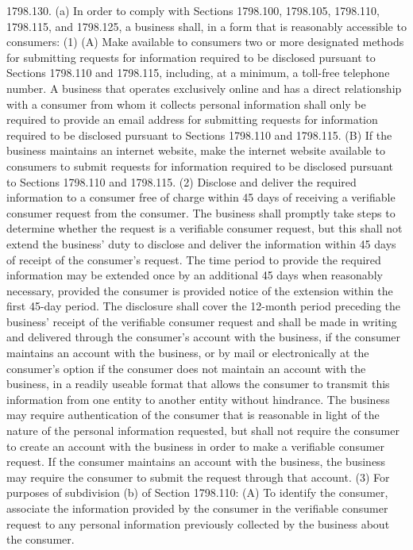 1798.130.  (a) In order to comply with Sections 1798.100, 1798.105, 1798.110, 1798.115, and 1798.125, a business shall, in a form that is reasonably accessible to consumers:
(1) (A) Make available to consumers two or more designated methods for submitting requests for information required to be disclosed pursuant to Sections 1798.110 and 1798.115, including, at a minimum, a toll-free telephone number. A business that operates exclusively online and has a direct relationship with a consumer from whom it collects personal information shall only be required to provide an email address for submitting requests for information required to be disclosed pursuant to Sections 1798.110 and 1798.115.
(B) If the business maintains an internet website, make the internet website available to consumers to submit requests for information required to be disclosed pursuant to Sections 1798.110 and 1798.115.
(2) Disclose and deliver the required information to a consumer free of charge within 45 days of receiving a verifiable consumer request from the consumer. The business shall promptly take steps to determine whether the request is a verifiable consumer request, but this shall not extend the business’ duty to disclose and deliver the information within 45 days of receipt of the consumer’s request. The time period to provide the required information may be extended once by an additional 45 days when reasonably necessary, provided the consumer is provided notice of the extension within the first 45-day period. The disclosure shall cover the 12-month period preceding the business’ receipt of the verifiable consumer request and shall be made in writing and delivered through the consumer’s account with the business, if the consumer maintains an account with the business, or by mail or electronically at the consumer’s option if the consumer does not maintain an account with the business, in a readily useable format that allows the consumer to transmit this information from one entity to another entity without hindrance. The business may require authentication of the consumer that is reasonable in light of the nature of the personal information requested, but shall not require the consumer to create an account with the business in order to make a verifiable consumer request. If the consumer maintains an account with the business, the business may require the consumer to submit the request through that account.
(3) For purposes of subdivision (b) of Section 1798.110:
(A) To identify the consumer, associate the information provided by the consumer in the verifiable consumer request to any personal information previously collected by the business about the consumer.
